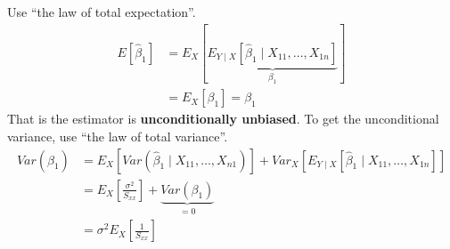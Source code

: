 \documentclass[12 pt]{article}
\begin{document}
Use ``the law of total expectation''.
\begin{align*}
  E[\hat{\beta}_1] & = E_X [\underbrace{E_{Y \mid X} [\hat{\beta}_1 \mid X_{11}, \ldots, X_{1n}]}_{\beta_1}]
  \\ & = E_X [\beta_1] = \beta_1
\end{align*}
That is the estimator is \textbf{unconditionally unbiased}. To get the
unconditional variance, use ``the law of total variance''.
\begin{align*}
  Var(\hat{\beta}_1) & = E_X[Var(\hat{\beta}_1 \mid X_{11}, \ldots, X_{n1})] + Var_X[E_{Y \mid X} [\hat{\beta}_1 \mid X_{11}, \ldots, X_{1n}]]
  \\ & = E_X \left[\frac{\sigma^2}{S_{xx}}\right] + \underbrace{Var(\beta_1)}_{=0}
  \\ & = \sigma^2 E_X \left[\frac{1}{S_{xx}}\right]
\end{align*}
\end{document}
